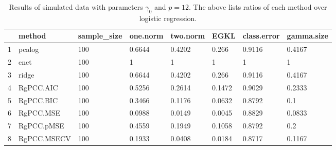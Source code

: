 \begin{table}[ht]
\centering
\begin{tabular}{rlllllll}
  \hline
 & method & sample\_size & one.norm & two.norm & EGKL & class.error & gamma.size \\ 
  \hline
1 & pcalog & 100 & 0.6644 & 0.4202 & 0.266 & 0.9116 & 0.4167 \\ 
  2 & enet & 100 & 1 & 1 & 1 & 1 & 1 \\ 
  3 & ridge & 100 & 0.6644 & 0.4202 & 0.266 & 0.9116 & 0.4167 \\ 
  4 & RgPCC.AIC & 100 & 0.5256 & 0.2614 & 0.1472 & 0.9029 & 0.2333 \\ 
  5 & RgPCC.BIC & 100 & 0.3466 & 0.1176 & 0.0632 & 0.8792 & 0.1 \\ 
  6 & RgPCC.MSE & 100 & 0.0988 & 0.0149 & 0.0045 & 0.8829 & 0.0833 \\ 
  7 & RgPCC.pMSE & 100 & 0.4559 & 0.1949 & 0.1058 & 0.8792 & 0.2 \\ 
  8 & RgPCC.MSECV & 100 & 0.1933 & 0.0408 & 0.0184 & 0.8717 & 0.1167 \\ 
   \hline
\end{tabular}
\caption{Results of simulated data with parameters $\gamma_0$ and $p =12$. The above lists ratios of each method over logistic regression.} 
\label{fig-0-debug-12-metrics-pratio}
\end{table}
